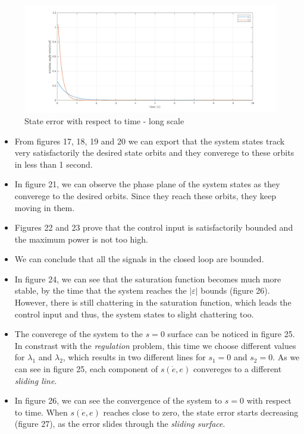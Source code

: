 \documentclass[a4paper]{article}
\begin{document}
\begin{figure}[H]
    \centering
    \includegraphics[width=15cm]{fig/sim2/elong.png}
    \caption{State error with respect to time - long scale}
\end{figure}

\begin{itemize}
    \item From figures 17, 18, 19 and 20 we can export that the system states track very satisfactorily the 
    desired state orbits and they converege to these orbits in less than 1 second.
    \item In figure 21, we can observe the phase plane of the system states as they converege to the 
    desired orbits. Since they reach these orbits, they keep moving in them.
    \item Figures 22 and 23 prove that the control input is satisfactorily bounded and the maximum power is not too high.
    \item We can conclude that all the signals in the closed loop are bounded.
    \item In figure 24, we can see that the saturation function becomes much more stable, by the time that the 
    system reaches the $| \varepsilon |$ bounds (figure 26). However, there is still chattering in the saturation function, 
    which leads the control input and thus, the system states to slight chattering too.
    \item The converege of the system to the $s=0$ surface can be noticed in figure 25. In constrast with the 
    \textit{regulation} problem, this time we choose different values for $\lambda_1$ and $\lambda_2$, which results in two different lines for 
    $s_1=0$ and $s_2=0$. As we can see in figure 25, each component of $s(\dot{e}, e)$ convereges to a different \textit{sliding line}. 
    \item In figure 26, we can see the convergence of the system to $s=0$ with respect to time. When $s(\dot{e}, e)$ reaches close to 
    zero, the state error starts decreasing (figure 27), as the error slides through the \textit{sliding surface}.
\end{itemize}
\end{document}
